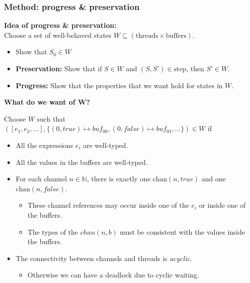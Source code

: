 \documentclass[aspectratio=169]{beamer}
\begin{document}
\begin{frame}[fragile]
  \frametitle{Method: progress \& preservation}
  \textbf{Idea of progress \& preservation:} \\
  Choose a set of well-behaved states $W \subseteq (\text{threads}\times\text{buffers})$.
  \begin{itemize}
    \item Show that $S_0 \in W$
    \item \textbf{Preservation:} Show that if $S \in W$ and $(S,S') \in \text{step}$, then $S' \in W$.
    \item \textbf{Progress:} Show that the properties that we want hold for states in $W$.
  \end{itemize}

  \bigskip
  \textbf{What do we want of W?}

  Choose $W$ such that $([e_1, e_2, \dots], \{(0,true) \mapsto buf_{00}, (0,false) \mapsto buf_{01}, \dots\}) \in W$ if
  \begin{itemize}
    \item All the expressions $e_i$ are well-typed.
    \item All the values in the buffers are well-typed.
    \item For each channel $n\in \mathbb{N}$, there is exactly one $\text{chan}(n,true)$ and one $\text{chan}(n,false)$.
    \begin{itemize}
      \item These channel references may occur inside one of the $e_i$ or inside one of the buffers.
      \item The types of the $chan(n,b)$ must be consistent with the values inside the buffers.
    \end{itemize}
    \item The connectivity between channels and threads is \emph{acyclic}.
    \begin{itemize}
      \item Otherwise we can have a deadlock due to cyclic waiting.
    \end{itemize}
  \end{itemize}
\end{frame}
\end{document}
